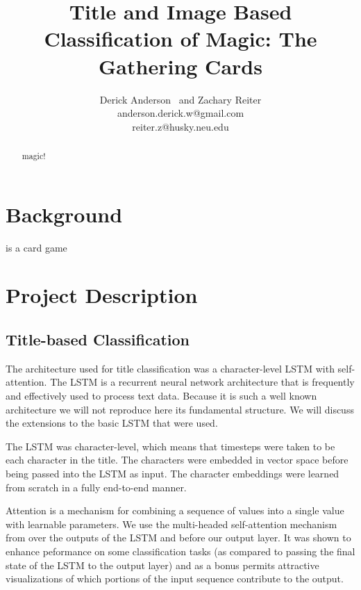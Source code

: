 \documentclass[letterpaper]{article} %
\begin{document}
%
\title{Title and Image Based Classification of Magic: The Gathering Cards}
\author{Derick Anderson \ and Zachary Reiter\\
  anderson.derick.w@gmail.com\\
  reiter.z@husky.neu.edu
}
\maketitle
\begin{abstract}
magic!
\end{abstract}



\section{Background}

is a card game

\section{Project Description}



\subsection{Title-based Classification}

The architecture used for title classification
was a character-level LSTM with self-attention.
The LSTM \cite{Hochreiter1997LongSM} is a recurrent neural network architecture
that is frequently and effectively \cite{Schmidhuber2015DeepLI}
used to process text data.
Because it is such a well known architecture
we will not reproduce here its fundamental structure.
We will discuss the extensions to the basic LSTM that were used.

The LSTM was character-level,
which means that timesteps were taken to be each character in the title.
The characters were embedded in vector space
before being passed into the LSTM as input.
The character embeddings were learned from scratch
in a fully end-to-end manner.

Attention is a mechanism for combining a sequence of values into a single value
with learnable parameters.
We use the multi-headed self-attention mechanism from \cite{Lin2017ASS}
over the outputs of the LSTM and before our output layer.
It was shown to enhance peformance on some classification tasks
(as compared to passing the final state of the LSTM to the output layer)
and as a bonus permits attractive visualizations
of which portions of the input sequence contribute to the output.
\end{document}
